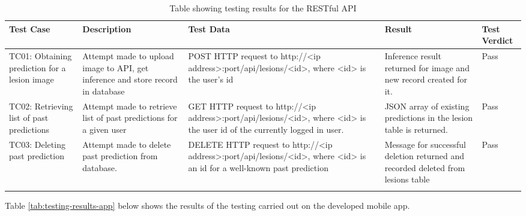 \documentclass[12pt, a4paper]{article}
\begin{document}
\renewcommand{\arraystretch}{1.0}
\setlength{\tabcolsep}{6pt}
\begin{xltabular}{1\textwidth} {
        | >{\raggedright\arraybackslash}X
        | >{\raggedright\arraybackslash}X
        | >{\raggedright\arraybackslash}X
        | >{\raggedright\arraybackslash}X
        | >{\raggedright\arraybackslash}X
        |}
    \hline
    \textbf{Test Case} & \textbf{Description} & \textbf{Test Data} & \textbf{Result} & \textbf{Test Verdict}\\\hline
    TC01: Obtaining prediction for a lesion image & Attempt made to upload image to API, get inference and store record in database & POST HTTP request to http://<ip address>:port/api/lesions/<id>, where <id> is the user's id & Inference result returned for image and new record created for it. & Pass\\\hline
    TC02: Retrieving list of past predictions & Attempt made to retrieve list of past predictions for a given user & GET HTTP request to http://<ip address>:port/api/lesions/<id>, where <id> is the user id of the currently logged in user. & JSON array of existing predictions in the lesion table is returned. & Pass\\\hline
    TC03: Deleting past prediction & Attempt made to delete past prediction from database. & DELETE HTTP request to http://<ip address>:port/api/lesions/<id>, where <id> is an id for a well-known past prediction & Message for successful deletion returned and recorded deleted from lesions table & Pass\\\hline

    \caption{Table showing testing results for the RESTful API}
    \label{tab:testing-results-api}
\end{xltabular}

Table \ref{tab:testing-results-app} below shows the results of the testing carried out on the developed mobile app.
\end{document}
